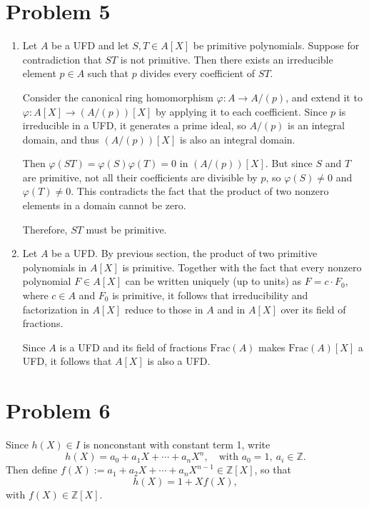 \documentclass[12pt]{article}
\begin{document}
\section*{Problem 5}
\begin{enumerate}[label=(\arabic*)]
    \item
Let \( A \) be a UFD and let \( S, T \in A[X] \) be primitive polynomials. Suppose for contradiction that \( ST \) is not primitive. Then there exists an irreducible element \( p \in A \) such that \( p \) divides every coefficient of \( ST \).

Consider the canonical ring homomorphism \( \varphi: A \to A/(p) \), and extend it to \( \varphi: A[X] \to (A/(p))[X] \) by applying it to each coefficient. Since \( p \) is irreducible in a UFD, it generates a prime ideal, so \( A/(p) \) is an integral domain, and thus \( (A/(p))[X] \) is also an integral domain.

Then \( \varphi(ST) = \varphi(S)\varphi(T) = 0 \) in \( (A/(p))[X] \). But since \( S \) and \( T \) are primitive, not all their coefficients are divisible by \( p \), so \( \varphi(S) \ne 0 \) and \( \varphi(T) \ne 0 \). This contradicts the fact that the product of two nonzero elements in a domain cannot be zero.

Therefore, \( ST \) must be primitive.

\item
Let \( A \) be a UFD. By previous section, the product of two primitive polynomials in \( A[X] \) is primitive. Together with the fact that every nonzero polynomial \( F \in A[X] \) can be written uniquely (up to units) as \( F = c \cdot F_0 \), where \( c \in A \) and \( F_0 \) is primitive, it follows that irreducibility and factorization in \( A[X] \) reduce to those in \( A \) and in \( A[X] \) over its field of fractions.

Since \( A \) is a UFD and its field of fractions \( \text{Frac}(A) \) makes \( \text{Frac}(A)[X] \) a UFD, it follows that \( A[X] \) is also a UFD.
\end{enumerate}

\section*{Problem 6}
Since \( h(X) \in I \) is nonconstant with constant term 1, write
\[
h(X) = a_0 + a_1 X + \cdots + a_n X^n, \quad \text{with } a_0 = 1, \ a_i \in \mathbb{Z}.
\]
Then define \( f(X) := a_1 + a_2 X + \cdots + a_n X^{n-1} \in \mathbb{Z}[X] \), so that
\[
h(X) = 1 + X f(X),
\]
with \( f(X) \in \mathbb{Z}[X] \).
\end{document}
